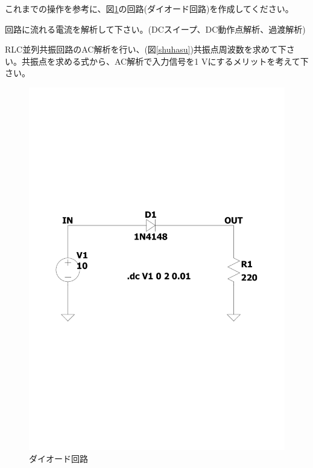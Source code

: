 \begin{description}
  \setlength{\parskip}{0cm} %
  \setlength{\itemsep}{0cm} %
  \item[任意課題1] これまでの操作を参考に、図\ref{diode}の回路(ダイオード回路)を作成してください。
  \item[任意課題2] 回路に流れる電流を解析して下さい。(DCスイープ、DC動作点解析、過渡解析)
  \item[任意課題3] RLC並列共振回路のAC解析を行い、(図\ref{shuhasu})共振点周波数を求めて下さい。共振点を求める式から、AC解析で入力信号を1 Vにするメリットを考えて下さい。 
  \begin{figure}[htbp]
    \begin{center}
    \includegraphics[width=\linewidth]{img/15.pdf}
    \caption{ダイオード回路}
    \label{diode}
    \end{center}
  \end{figure}

\end{description}
